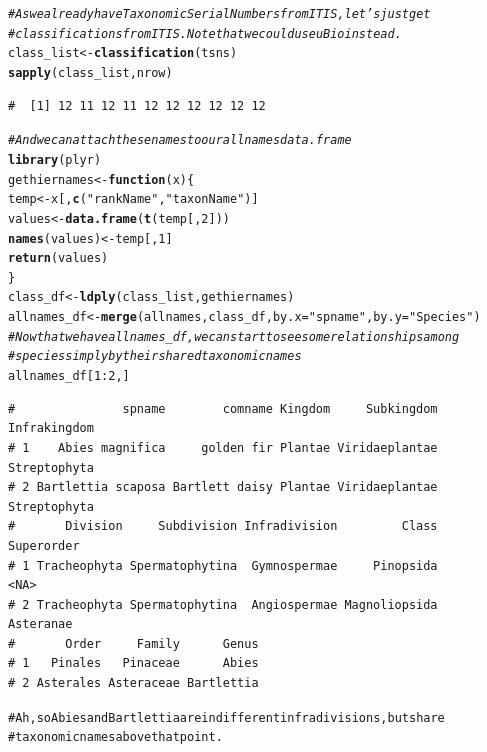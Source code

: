 \documentclass[letterpaper,superscriptaddress,showkeys,longbibliography]{revtex4-1}\usepackage[]{graphicx}\usepackage[]{color}
\makeatletter
\newcommand{\hlnum}[1]{\textcolor[rgb]{0.686,0.059,0.569}{#1}}%
\newcommand{\hlstr}[1]{\textcolor[rgb]{0.192,0.494,0.8}{#1}}%
\newcommand{\hlcom}[1]{\textcolor[rgb]{0.678,0.584,0.686}{\textit{#1}}}%
\newcommand{\hlopt}[1]{\textcolor[rgb]{0,0,0}{#1}}%
\newcommand{\hlstd}[1]{\textcolor[rgb]{0.345,0.345,0.345}{#1}}%
\newcommand{\hlkwa}[1]{\textcolor[rgb]{0.161,0.373,0.58}{\textbf{#1}}}%
\newcommand{\hlkwb}[1]{\textcolor[rgb]{0.69,0.353,0.396}{#1}}%
\newcommand{\hlkwc}[1]{\textcolor[rgb]{0.333,0.667,0.333}{#1}}%
\newcommand{\hlkwd}[1]{\textcolor[rgb]{0.737,0.353,0.396}{\textbf{#1}}}%
\newenvironment{kframe}{%
 \def\at@end@of@kframe{}%
 \ifinner\ifhmode%
  \def\at@end@of@kframe{\end{minipage}}%
  \begin{minipage}{\columnwidth}%
 \fi\fi%
 \def\FrameCommand##1{\hskip\@totalleftmargin \hskip-\fboxsep
 \colorbox{shadecolor}{##1}\hskip-\fboxsep
     \hskip-\linewidth \hskip-\@totalleftmargin \hskip\columnwidth}%
 \MakeFramed {\advance\hsize-\width
   \@totalleftmargin\z@ \linewidth\hsize
   \@setminipage}}%
 {\par\unskip\endMakeFramed%
 \at@end@of@kframe}
\newenvironment{knitrout}{}{} %
\makeatother
\begin{document}
\begin{knitrout}
\color{fgcolor}\begin{kframe}
\begin{alltt}
\hlcom{# As we already have Taxonomic Serial Numbers from ITIS, let's just get}
\hlcom{# classifications from ITIS. Note that we could use uBio instead.}
\hlstd{class_list} \hlkwb{<-} \hlkwd{classification}\hlstd{(tsns)}
\hlkwd{sapply}\hlstd{(class_list, nrow)}
\end{alltt}
\begin{verbatim}
#  [1] 12 11 12 11 12 12 12 12 12 12
\end{verbatim}
\begin{alltt}
\hlcom{# And we can attach these names to our allnames data.frame}
\hlkwd{library}\hlstd{(plyr)}
\hlstd{gethiernames} \hlkwb{<-} \hlkwa{function}\hlstd{(}\hlkwc{x}\hlstd{) \{}
    \hlstd{temp} \hlkwb{<-} \hlstd{x[,} \hlkwd{c}\hlstd{(}\hlstr{"rankName"}\hlstd{,} \hlstr{"taxonName"}\hlstd{)]}
    \hlstd{values} \hlkwb{<-} \hlkwd{data.frame}\hlstd{(}\hlkwd{t}\hlstd{(temp[,} \hlnum{2}\hlstd{]))}
    \hlkwd{names}\hlstd{(values)} \hlkwb{<-} \hlstd{temp[,} \hlnum{1}\hlstd{]}
    \hlkwd{return}\hlstd{(values)}
\hlstd{\}}
\hlstd{class_df} \hlkwb{<-} \hlkwd{ldply}\hlstd{(class_list, gethiernames)}
\hlstd{allnames_df} \hlkwb{<-} \hlkwd{merge}\hlstd{(allnames, class_df,} \hlkwc{by.x} \hlstd{=} \hlstr{"spname"}\hlstd{,} \hlkwc{by.y} \hlstd{=} \hlstr{"Species"}\hlstd{)}
\hlcom{# Now that we have allnames_df, we can start to see some relationships among}
\hlcom{# species simply by their shared taxonomic names}
\hlstd{allnames_df[}\hlnum{1}\hlopt{:}\hlnum{2}\hlstd{, ]}
\end{alltt}
\begin{verbatim}
#               spname        comname Kingdom     Subkingdom Infrakingdom
# 1    Abies magnifica     golden fir Plantae Viridaeplantae Streptophyta
# 2 Bartlettia scaposa Bartlett daisy Plantae Viridaeplantae Streptophyta
#       Division     Subdivision Infradivision         Class Superorder
# 1 Tracheophyta Spermatophytina  Gymnospermae     Pinopsida       <NA>
# 2 Tracheophyta Spermatophytina  Angiospermae Magnoliopsida  Asteranae
#       Order     Family      Genus
# 1   Pinales   Pinaceae      Abies
# 2 Asterales Asteraceae Bartlettia
\end{verbatim}
\begin{alltt}

# Ah, so Abies and Bartlettia are in different infradivisions, but share
# taxonomic names above that point.
\end{alltt}
\end{kframe}
\end{knitrout}
\end{document}

